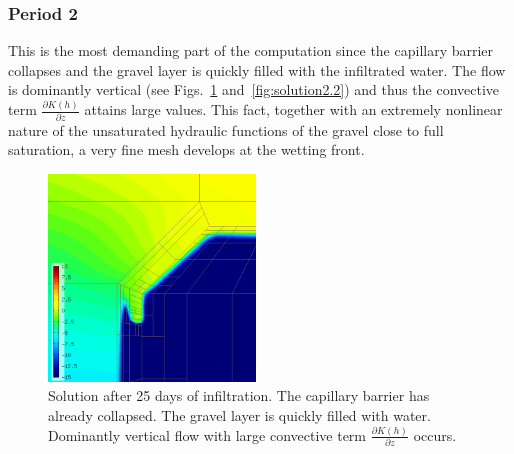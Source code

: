 \documentclass[final,3p,times,twocolumn]{elsarticle}
\begin{document}

\subsubsection{Period 2}
This is the most demanding part of the computation since the capillary barrier collapses 
and the gravel layer is quickly filled with the infiltrated water. The flow is dominantly 
vertical (see Figs.~\ref{fig:solution2.1} and~\ref{fig:solution2.2}) and thus the convective 
term $\frac{\partial K(h)}{\partial z}$ attains large values. This fact, together with an 
extremely nonlinear nature of the unsaturated 
hydraulic functions of the gravel close to full saturation,
a very fine mesh develops at the wetting front.

\begin{figure}[!ht]
\begin{center}
\includegraphics[height=5.5cm]{solution3-drainage.png}
\end{center}
\vspace{-4mm}
\caption{Solution after 25 days of infiltration. The capillary barrier has 
already collapsed. The gravel layer is quickly filled with water. Dominantly vertical flow with 
large convective term $\frac{\partial K(h)}{\partial z}$ occurs.}
\label{fig:solution2.1}
\end{figure}
\end{document}
